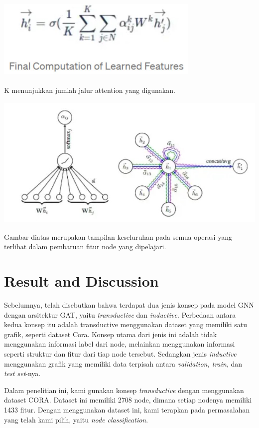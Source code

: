 \documentclass{article}
\begin{document}
\begin{center}
\includegraphics[width=3.85417in,height=1.54167in]{Picture/Fig8.jpg}
\end{center}

K menunjukkan jumlah jalur attention yang digunakan.

\begin{center}
\includegraphics[width=5.25521in,height=2.51976in]{Picture/Fig9.jpg}
\end{center}

Gambar diatas merupakan tampilan keseluruhan pada semua operasi yang terlibat dalam pembaruan fitur node yang dipelajari.

\section{Result and Discussion}
Sebelumnya, telah disebutkan bahwa terdapat dua jenis konsep pada model GNN dengan arsitektur GAT, yaitu \textit{transductive} dan \textit{inductive}. Perbedaan antara kedua konsep itu adalah transductive menggunakan dataset yang memiliki satu grafik, seperti dataset Cora. Konsep utama dari jenis ini adalah tidak menggunakan informasi label dari node, melainkan menggunakan informasi seperti struktur dan fitur dari tiap node tersebut. Sedangkan jenis \textit{inductive} menggunakan grafik yang memiliki data terpisah antara \textit{validation, train}, dan \textit{test set}-nya.

Dalam penelitian ini, kami gunakan konsep \textit{transductive} dengan menggunakan dataset CORA. Dataset ini memiliki 2708 node, dimana setiap nodenya memiliki 1433 fitur. Dengan menggunakan dataset ini, kami terapkan pada permasalahan yang telah kami pilih, yaitu \textit{node classification}.
\end{document}
